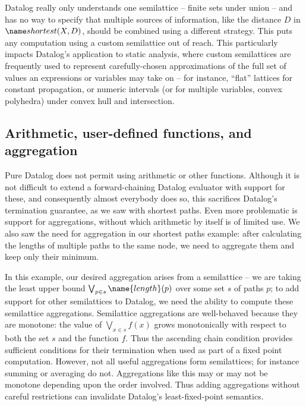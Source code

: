 Datalog really only understands one semilattice -- finite sets under union --
and has no way to specify that multiple sources of information, like the
distance $D$ in $\atom{shortest}{X,D}$, should be combined using a different
strategy. This puts any computation using a custom semilattice out of reach.
This particularly impacts Datalog's application to static analysis, where custom
semilattices are frequently used to represent carefully-chosen approximations of
the full set of values an expressions or variables may take on -- for instance,
``flat'' lattices for constant propagation, or numeric intervals (or for
multiple variables, convex polyhedra) under convex hull and intersection.
%


\subsection{Arithmetic, user-defined functions, and aggregation}

Pure Datalog does not permit using arithmetic or other functions.
%
Although it is not difficult to extend a forward-chaining Datalog evaluator with support for these, and consequently almost everybody does so, this sacrifices Datalog's termination guarantee, as we saw with shortest paths.
%
Even more problematic is support for aggregations, without which arithmetic by itself is of limited use.
%
We also saw the need for aggregation in our shortest paths example: after calculating the lengths of multiple paths to the same node, we need to aggregate them and keep only their minimum.

In this example, our desired aggregation arises from a semilattice -- we are taking the least upper bound $\bigvee_{p \in s} \name{length}(p)$ over some set $s$ of paths $p$; to add support for other semilattices to Datalog, we need the ability to compute these semilattice aggregations.
%
Semilattice aggregations are well-behaved because they are monotone: the value of $\bigvee_{x \in s} f(x)$ grows monotonically with respect to both the set $s$ and the function $f$.
%
Thus the ascending chain condition provides sufficient conditions for their termination when used as part of a fixed point computation.
%
However, not all useful aggregations form semilattices; for instance summing or averaging do not.
%
Aggregations like this may or may not be monotone depending upon the order involved. Thus adding aggregations without careful restrictions can invalidate Datalog's least-fixed-point semantics.

